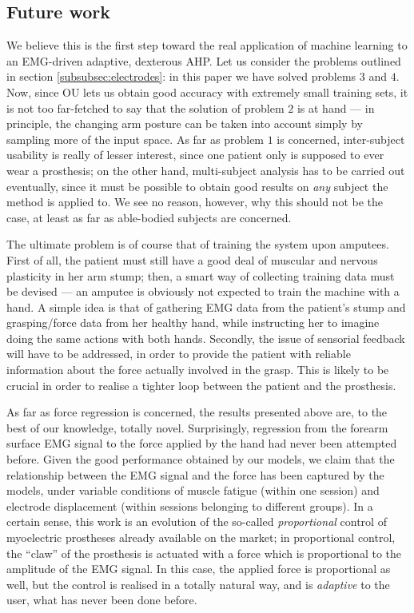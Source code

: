 \subsection*{Future work}

We believe this is the first step toward the real application of
machine learning to an EMG-driven adaptive, dexterous AHP. Let us
consider the problems outlined in section
\ref{subsubsec:electrodes}: in this paper we have solved problems
$3$ and $4$. Now, since OU lets us obtain good accuracy with extremely
small training sets, it is not too far-fetched to say that the
solution of problem $2$ is at hand --- in principle, the changing arm
posture can be taken into account simply by sampling more of the input
space. As far as problem $1$ is concerned, inter-subject usability is
really of lesser interest, since one patient only is supposed to ever
wear a prosthesis; on the other hand, multi-subject analysis has to be
carried out eventually, since it must be possible to obtain good
results on \emph{any} subject the method is applied to. We see no
reason, however, why this should not be the case, at least as far as
able-bodied subjects are concerned.

The ultimate problem is of course that of training the system upon
amputees. First of all, the patient must still have a good deal of
muscular and nervous plasticity in her arm stump; then, a smart way of
collecting training data must be devised --- an amputee is obviously
not expected to train the machine with a hand. A simple idea is that
of gathering EMG data from the patient's stump and grasping/force data
from her healthy hand, while instructing her to imagine doing the same
actions with both hands. Secondly, the issue of sensorial feedback
will have to be addressed, in order to provide the patient with
reliable information about the force actually involved in the
grasp. This is likely to be crucial in order to realise a 
tighter loop between the patient and the prosthesis.

As far as force regression is concerned, the results presented above
are, to the best of our knowledge, totally novel. Surprisingly,
regression from the forearm surface EMG signal to the force applied by
the hand had never been attempted before. Given the good performance
obtained by our models, we claim that the relationship between the EMG
signal and the force has been captured by the models, under variable
conditions of muscle fatigue (within one session) and electrode
displacement (within sessions belonging to different groups). In a
certain sense, this work is an evolution of the so-called
\emph{proportional} control of myoelectric prostheses already
available on the market; in proportional control, the ``claw'' of the
prosthesis is actuated with a force which is proportional to the
amplitude of the EMG signal. In this case, the applied force is
proportional as well, but the control is realised in a totally natural
way, and is \emph{adaptive} to the user, what has never been done
before.
